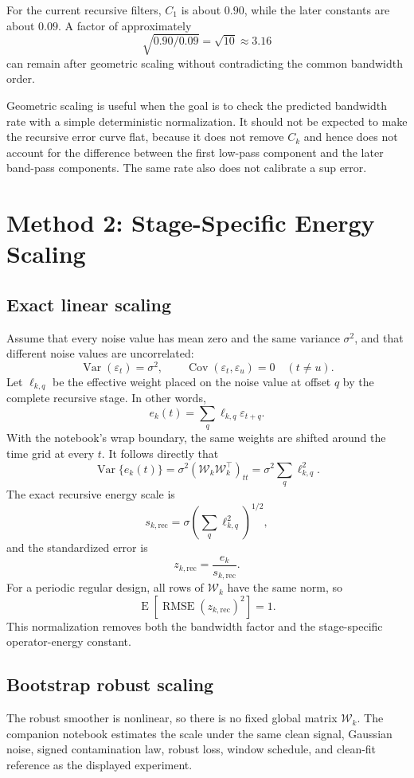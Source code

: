 \documentclass[11pt]{article}
\newcommand{\E}{\operatorname{E}}
\newcommand{\Var}{\operatorname{Var}}
\newcommand{\RMSE}{\operatorname{RMSE}}
\newcommand{\Wcal}{\mathcal{W}}
\begin{document}
For the current recursive filters, $C_1$ is about $0.90$, while the later
constants are about $0.09$. A factor of approximately
\[
\sqrt{0.90/0.09}=\sqrt{10}\approx3.16
\]
can remain after geometric scaling without contradicting the common bandwidth
order.

Geometric scaling is useful when the goal is to check the predicted bandwidth
rate with a simple deterministic normalization. It should not be expected to
make the recursive error curve flat, because it does not remove $C_k$ and hence
does not account for the difference between the first low-pass component and the
later band-pass components. The same rate also does not calibrate a sup error.

\section{Method 2: Stage-Specific Energy Scaling}

\subsection{Exact linear scaling}

Assume that every noise value has mean zero and the same variance $\sigma^2$,
and that different noise values are uncorrelated:
\[
\Var(\varepsilon_t)=\sigma^2,
\qquad
\operatorname{Cov}(\varepsilon_t,\varepsilon_u)=0\quad(t\ne u).
\]
Let $\ell_{k,q}$ be the effective weight placed on the noise value at offset $q$
by the complete recursive stage. In other words,
\[
e_k(t)=\sum_q \ell_{k,q}\varepsilon_{t+q}.
\]
With the notebook's wrap boundary, the same weights are shifted around the time
grid at every $t$. It follows directly that
\[
\Var\{e_k(t)\}
=\sigma^2(\Wcal_k\Wcal_k^\top)_{tt}
=\sigma^2\sum_q\ell_{k,q}^2.
\]
The exact recursive energy scale is
\[
s_{k,\mathrm{rec}}
=\sigma\left(\sum_q\ell_{k,q}^2\right)^{1/2},
\]
and the standardized error is
\[
z_{k,\mathrm{rec}}
=\frac{e_k}{s_{k,\mathrm{rec}}}.
\]
For a periodic regular design, all rows of $\Wcal_k$ have the same norm, so
\[
\E\!\left[\RMSE(z_{k,\mathrm{rec}})^2\right]=1.
\]
This normalization removes both the bandwidth factor and the stage-specific
operator-energy constant.

\subsection{Bootstrap robust scaling}

The robust smoother is nonlinear, so there is no fixed global matrix
$\Wcal_k$. The companion notebook estimates the scale under the same clean
signal, Gaussian noise, signed contamination law, robust loss, window schedule,
and clean-fit reference as the displayed experiment.
\end{document}
